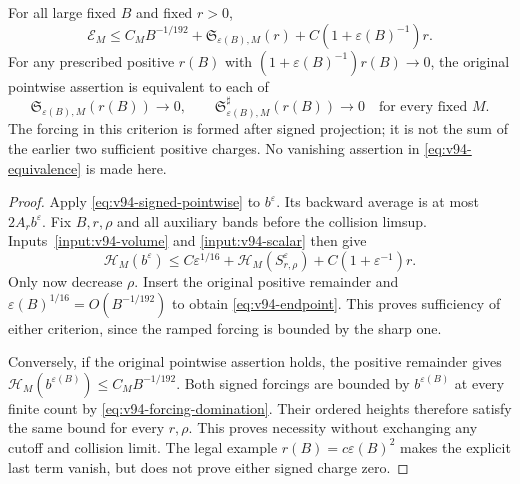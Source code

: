 \begin{theorem}
\label{thm:v94-endpoint}
For all large fixed $B$ and fixed $r>0$,
\begin{equation}\label{eq:v94-endpoint}
 \mathcal E_M\le C_MB^{-1/192}
       +\mathfrak S_{\varepsilon(B),M}(r)
       +C(1+\varepsilon(B)^{-1})r.
\end{equation}
For any prescribed positive $r(B)$ with
$(1+\varepsilon(B)^{-1})r(B)\to0$, the original pointwise assertion
is equivalent to each of
\begin{equation}\label{eq:v94-equivalence}
 \mathfrak S_{\varepsilon(B),M}(r(B))\longrightarrow0,
 \qquad
 \mathfrak S_{\varepsilon(B),M}^{\sharp}(r(B))\longrightarrow0
                 \quad\text{for every fixed }M.
\end{equation}
The forcing in this criterion is formed after signed projection; it
is not the sum of the earlier two sufficient positive charges.
No vanishing assertion in \eqref{eq:v94-equivalence} is made here.
\end{theorem}
\begin{proof}
Apply \eqref{eq:v94-signed-pointwise} to $b^\varepsilon$.
Its backward average is at most $2A_rb^\varepsilon$. Fix
$B,r,\rho$ and all auxiliary bands before the collision limsup.
Inputs~\ref{input:v94-volume} and \ref{input:v94-scalar} then give
\[
 \mathcal H_M(b^\varepsilon)
 \le C\varepsilon^{1/16}+
      \mathcal H_M(S_{r,\rho}^\varepsilon)
                        +C(1+\varepsilon^{-1})r.
\]
Only now decrease $\rho$. Insert the original positive remainder and
$\varepsilon(B)^{1/16}=O(B^{-1/192})$ to obtain
\eqref{eq:v94-endpoint}. This proves sufficiency of either criterion,
since the ramped forcing is bounded by the sharp one.

Conversely, if the original pointwise assertion holds, the positive
remainder gives
$\mathcal H_M(b^{\varepsilon(B)})\le C_MB^{-1/192}$.
Both signed forcings are bounded by $b^{\varepsilon(B)}$ at every
finite count by \eqref{eq:v94-forcing-domination}. Their ordered
heights therefore satisfy the same bound for every $r,\rho$.
This proves necessity without exchanging any cutoff and collision
limit. The legal example $r(B)=c\varepsilon(B)^2$ makes the explicit
last term vanish, but does not prove either signed charge zero.
\end{proof}
